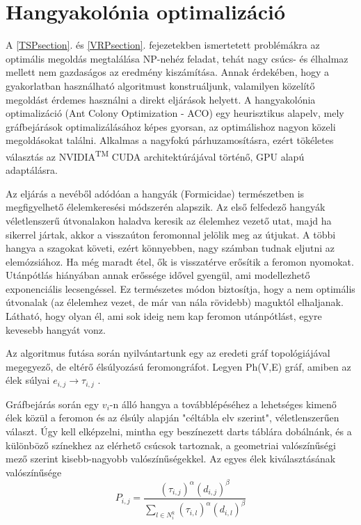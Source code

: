 \section{Hangyakolónia optimalizáció}
A \ref{TSPsection}. és \ref{VRPsection}. fejezetekben ismertetett problémákra az optimális megoldás megtalálása NP-nehéz feladat, tehát nagy csúcs- és élhalmaz mellett nem gazdaságos az eredmény kiszámítása. Annak érdekében, hogy a gyakorlatban használható algoritmust konstruáljunk, valamilyen közelítő megoldást érdemes használni a direkt eljárások helyett. A hangyakolónia optimalizáció (Ant Colony Optimization - ACO) egy heurisztikus alapelv, mely gráfbejárások optimalizálásához képes gyorsan, az optimálishoz nagyon közeli megoldásokat találni. Alkalmas a nagyfokú párhuzamosításra, ezért tökéletes választás az NVIDIA\textsuperscript{TM} CUDA architektúrájával történő, GPU alapú adaptálásra.

Az eljárás a nevéből adódóan a hangyák (Formicidae) természetben is megfigyelhető élelemkeresési módszerén alapszik. Az első felfedező hangyák véletlenszerű útvonalakon haladva keresik az élelemhez vezető utat, majd ha sikerrel jártak, akkor a visszaúton feromonnal jelölik meg az útjukat. A többi hangya a szagokat követi, ezért könnyebben, nagy számban tudnak eljutni az elemózsiához. Ha még maradt étel, ők is visszatérve erősítik a feromon nyomokat. Utánpótlás hiányában annak erőssége idővel gyengül, ami modellezhető exponenciális lecsengéssel. Ez természetes módon biztosítja, hogy a nem optimális útvonalak (az élelemhez vezet, de már van nála rövidebb) maguktól elhaljanak. Látható, hogy olyan él, ami sok ideig nem kap feromon utánpótlást, egyre kevesebb hangyát vonz.

Az algoritmus futása során nyilvántartunk egy az eredeti gráf topológiájával megegyező, de eltérő élsúlyozású feromongráfot. Legyen Ph(V,E) gráf, amiben az élek súlyai \( e_{i,j} \rightarrow \tau_{i,j} \) .

Gráfbejárás során egy \(v_i\)-n álló hangya a továbblépéséhez a lehetséges kimenő élek közül a feromon és az élsúly alapján "céltábla elv szerint", véletlenszerűen választ. Úgy kell elképzelni, mintha egy beszínezett darts táblára dobálnánk, és a különböző színekhez az elérhető csúcsok tartoznak, a geometriai valószínűségi mező szerint kisebb-nagyobb valószínűségekkel. Az egyes élek kiválasztásának valószínűsége
\begin{equation}
	P_{i,j} = \frac{(\tau_{i,j})^\alpha(d_{i,j})^\beta}{\sum_{l \in N_i^k}(\tau_{i,l})^\alpha(d_{i,l})^\beta }
	\label{ACO_General_probability}
\end{equation}


